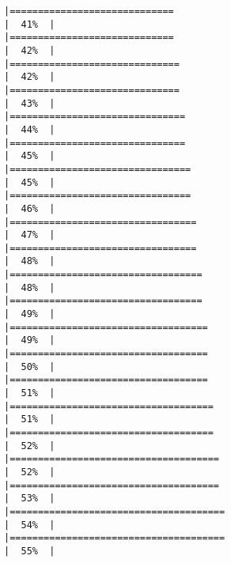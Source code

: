 \documentclass[
]{book}
\begin{document}
\begin{verbatim}
|=============================                                         |  41%  |                                                                              |=============================                                         |  42%  |                                                                              |==============================                                        |  42%  |                                                                              |==============================                                        |  43%  |                                                                              |===============================                                       |  44%  |                                                                              |===============================                                       |  45%  |                                                                              |================================                                      |  45%  |                                                                              |================================                                      |  46%  |                                                                              |=================================                                     |  47%  |                                                                              |=================================                                     |  48%  |                                                                              |==================================                                    |  48%  |                                                                              |==================================                                    |  49%  |                                                                              |===================================                                   |  49%  |                                                                              |===================================                                   |  50%  |                                                                              |===================================                                   |  51%  |                                                                              |====================================                                  |  51%  |                                                                              |====================================                                  |  52%  |                                                                              |=====================================                                 |  52%  |                                                                              |=====================================                                 |  53%  |                                                                              |======================================                                |  54%  |                                                                              |======================================                                |  55%  |                                                                              
\end{verbatim}
\end{document}
